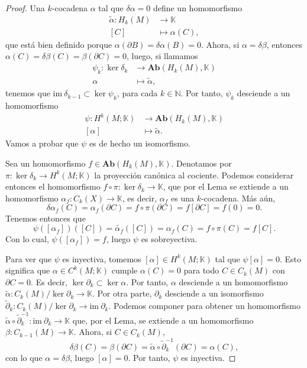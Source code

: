 \documentclass[12pt,a4paper]{book}
\theoremstyle{definition} \newtheorem{defn}[thm]{Definición}
\theoremstyle{definition} \newtheorem{ejemplo}[thm]{Ejemplo}
\theoremstyle{definition} \newtheorem{ejercicio}[thm]{Ejercicio}
\theoremstyle{remark} \newtheorem*{obs}{Observación}
\def\KK{\mathbb{K}}
\def\NN{\mathbb{N}}
\def\im{\mathrm{im}\ }
\begin{document}
\begin{proof}
  Una $k$-cocadena $\alpha$ tal que $\delta \alpha = 0$ define un homomorfismo
  \begin{align*}
    \tilde{\alpha}:H_k(M)&\longrightarrow \KK\\ 
     [C] &\longmapsto \alpha(C),
    \end{align*}
    que está bien definido porque $\alpha(\partial B)=\delta \alpha(B)=0$. Ahora, si $\alpha=\delta \beta$, entonces $\alpha(C)=\delta \beta (C)=\beta (\partial C)=0$, luego, si llamamos
    \begin{align*}
      \psi_k :\ker \delta_k&\longrightarrow \mathbf{Ab}(H_k(M),\KK)\\ 
      \alpha &\longmapsto \tilde{\alpha}, 
      \end{align*}
    tenemos que
    $\im \delta_{k-1} \subset \ker \psi_k$, para cada $k\in \NN$. Por tanto, $\psi_k$ desciende a un homomorfismo 
    \begin{align*}
      \psi :H^k(M;\KK)&\longrightarrow \mathbf{Ab}(H_k(M),\KK)\\ 
      [\alpha] &\longmapsto \tilde{\alpha}. 
      \end{align*}
Vamos a probar que $\psi$ es de hecho un isomorfismo.

Sea un homomorfismo $f\in \mathbf{Ab}(H_k(M),\KK)$. Denotamos por $\pi:\ker \delta_k \rightarrow H^k(M;\KK)$ la proyección canónica al cociente. Podemos considerar entonces el homomorfismo $f\circ \pi: \ker \delta_k \rightarrow \KK$, que por el Lema se extiende a un homomorfismo $\alpha_f:C_k(X)\rightarrow \KK$, es decir, $\alpha_f$ es una $k$-cocadena. Más aún,
\begin{equation*}
  \delta \alpha_f (C)=\alpha_f (\partial C) = f\circ \pi (\partial C) =f [\partial C] = f(0) =0.
\end{equation*}
Tenemos entonces que $$\psi([\alpha_f])([C])=\tilde{\alpha_f}([C])=\alpha_f(C)=f\circ \pi (C)=f[C].$$ Con lo cual, $\psi([\alpha_f])=f$, luego $\psi$ es sobreyectiva. 

Para ver que $\psi$ es inyectiva, tomemos $[\alpha] \in H^k(M; \KK)$ tal que $\psi[\alpha]=0$. Esto significa que $\alpha \in C^k(M; \KK)$ cumple $\alpha(C)=0$ para todo $C\in C_k(M)$ con $\partial C = 0$. Es decir, $\ker \partial_k \subset \ker \alpha$. Por tanto,  $\alpha$ desciende a un homomorfismo $\tilde{\alpha}:C_k(M)/\ker \partial_k \rightarrow \KK$. Por otra parte, $\partial_k$ desciende a un isomorfismo
$\tilde{\partial}_k :C_k(M)/\ker \partial_k\rightarrow \im \partial_k$. Podemos componer para obtener un homomorfismo $\tilde{\alpha}\circ \tilde{\partial}_k^{-1}: \im \partial_k \rightarrow \KK$ que, por el Lema, se extiende a un homomorfismo $\beta:C_{k-1}(M) \rightarrow \KK$. Ahora, si $C\in C_k(M)$,
\begin{equation*}
  \delta \beta(C)=\beta(\partial C)=\tilde{\alpha}\circ \tilde{\partial}_k^{-1}(\partial C)=\alpha(C),
\end{equation*}
con lo que $\alpha = \delta \beta$, luego $[\alpha]=0$. Por tanto, $\psi$ es inyectiva.
\end{proof}
\end{document}
